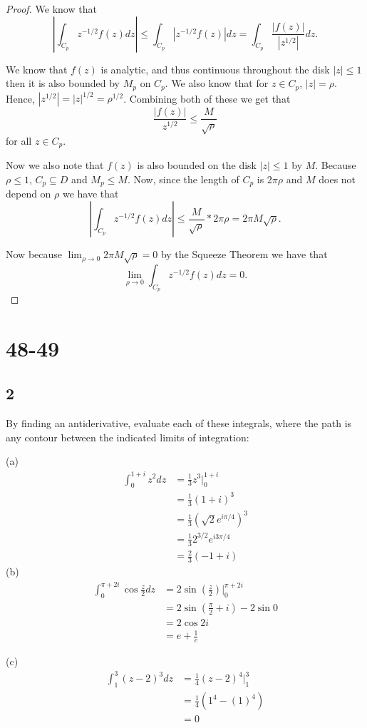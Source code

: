 \documentclass{article}
\begin{document}
\begin{proof}
    We know that
    $$\left | \int_{C_p} z^{-1/2}f(z) dz \right | \leq \int_{C_p} |z^{-1/2}f(z) | dz
        = \int_{C_p} \frac{|f(z)|}{|z^{1/2}|}dz.$$

    We know that $f(z)$ is analytic, and thus continuous throughout the disk $|z| \leq 1$
    then it is also bounded by $M_p$ on $C_p$. We also know that for
    $z \in C_p$, $|z| = \rho$. Hence,
    ${|z^{1/2}| = |z|^{1/2} = \rho^{1/2}}$. Combining both of these we get that
    $$\frac{|f(z)|}{z^{1/2}} \leq \frac{M}{\sqrt{\rho}}$$ for all $z \in C_p$.

    Now we also note that $f(z)$ is also bounded on the disk $|z| \leq 1$ by $M$.
    Because $\rho \leq 1$, $C_p \subseteq D$ and $M_p \leq M$. Now, since the
    length of $C_p$ is $2\pi \rho$ and $M$ does not depend on $\rho$ we have that
    $$\left | \int_{C_p} z^{-1/2}f(z) dz \right | \leq \frac{M}{\sqrt{\rho}}*2\pi\rho
        = 2\pi M \sqrt{\rho}.$$

    Now because $\lim_{\rho \rightarrow 0} 2\pi M \sqrt{\rho} = 0$ by the Squeeze
    Theorem we have that
    $$\lim_{\rho \rightarrow 0} \int_{C_p} z^{-1/2}f(z) dz = 0.$$


\end{proof}

\section*{48-49}
\subsection*{2} %
By finding an antiderivative, evaluate each of these integrals, where
the path is any contour between the indicated limits of integration:

(a)
\begin{align*}
    \int_0^{1+i} z^2 dz & = \frac{1}{3} z^3 \Big |_0^{1+i}    \\
                        & = \frac{1}{3}(1+ i)^3               \\
                        & = \frac{1}{3}(\sqrt{2}e^{i\pi/4})^3 \\
                        & = \frac{1}{3}2^{3/2}e^{i{3\pi/4}}   \\
                        & = \frac{2}{3}(-1+i)
\end{align*}
(b)
\begin{align*}
    \int_0^{\pi + 2i} \cos \frac{z}{2}dz & = 2\sin(\frac{z}{2}) \Big |_0^{\pi +2i} \\
                                         & =2\sin(\frac{\pi}{2} + i) - 2\sin 0     \\
                                         & =2\cos 2i                               \\
                                         & = e + \frac{1}{e}
\end{align*}

(c)
\begin{align*}
    \int_1^3(z - 2)^3 dz & = \frac{1}{4}(z - 2)^4 \Big |_1^3 \\
                         & = \frac{1}{4}(1^4 - (1)^4)        \\
                         & = 0
\end{align*}
\end{document}
